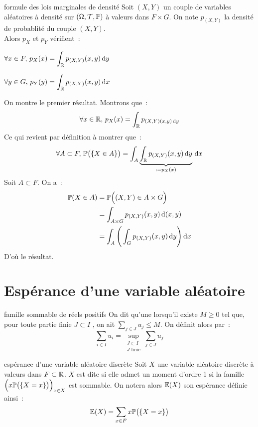 \begin{proposition}{}{formule des lois marginales de densité}
    Soit $(X,Y)$ un couple de variables aléatoires à densité sur $(\Omega, \mathcal{T}, \mathbb{P})$ à valeurs dans $F\times G$. On note $p_{(X,Y)}$ la densité de probablité du couple $(X,Y)$. \\ Alors $p_X$ et $p_Y$ vérifient~:
    \begin{enumeratebf}
        \item $\displaystyle \forall x \in F,\,  p_X(x) = \int_{\mathbb{R}} p_{(X,Y)}(x,y)\,\mathrm{d}y$
        \item $\displaystyle \forall y \in G,\,  p_Y(y) = \int_{\mathbb{R}} p_{(X,Y)}(x,y)\,\mathrm{d}x$
    \end{enumeratebf}
\end{proposition}

\begin{demonstration}
    On montre le premier résultat. Montrons que~:
    $$\forall x \in \mathbb{R},\,  p_X(x) = \int_{\mathbb{R}} p_{(X,Y)(x,y)\,\mathrm{d}y}$$
    Ce qui revient par définition à montrer que~:
    $$\forall A \subset F,\, \mathbb{P}\big(\{X \in A\}\big) = \int_A \underbrace{\int_{\mathbb{R}} p_{(X,Y)}(x,y)\,\mathrm{d}y}_{:=p_X(x)} \,\mathrm{d}x$$
    Soit $A \subset F$. On a~:
    \begin{align*}
        \mathbb{P}(X \in A) &= \mathbb{P}\Big((X,Y) \in A \times G\Big)\\
        &= \int_{A \times G} p_{(X,Y)}(x,y)\,\mathrm{d}(x,y) \\
        &= \int_A \Bigg(\int_G p_{(X,Y)}(x,y)\,\mathrm{d}y\Bigg)\,\mathrm{d}x
    \end{align*}
    D'où le résultat.
\end{demonstration}


\section{Espérance d'une variable aléatoire}

\begin{definition}{}{famille sommable de réels positifs}
    On dit qu’une  lorsqu’il existe $M\geq 0$ tel que, pour toute partie finie $J \subset I$ , on ait $\sum_{j \in J}u_j \leq M$.
    On définit alors  par~:
    $$\sum_{i \in I}u_i = \sup_{\substack{J \subset I \\ J\text{ finie}}} \sum_{j \in J} u_j$$
\end{definition}

\begin{definition}{}{espérance d'une variable aléatoire discrète}
    Soit $X$ une variable aléatoire discrète à valeurs dans $F \subset \mathbb{R}$.
    $X$ est dite  si elle admet un moment d'ordre 1 \ie si la famille $\Big(x\mathbb{P}\big(\{X = x\}\big)\Big)_{x \in X}$ est sommable. On notera alors $\mathbb{E}(X)$ son espérance définie ainsi~:
    $$\mathbb{E}(X) = \sum_{x \in F} x\mathbb{P}\big(\{X = x\}\big)$$
    
\end{definition}

